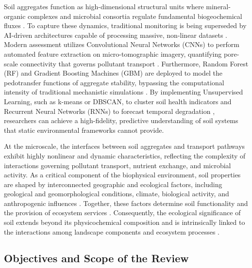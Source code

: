 \documentclass[preprint,12pt]{elsarticle}            %
\begin{document}
Soil aggregates function as high-dimensional structural units where
mineral-organic complexes and microbial consortia regulate fundamental
biogeochemical fluxes \cite{Six2004}. To capture these dynamics, traditional
monitoring is being superseded by AI-driven architectures capable of
processing massive, non-linear datasets
\cite{Lal2015,Baveye2016,Lehmann2020}. Modern assessment utilizes
Convolutional Neural Networks (CNNs) to perform automated feature extraction
on micro-tomographic imagery, quantifying pore-scale connectivity that governs
pollutant transport \cite{Demiral2026,Chen2025}. Furthermore, Random Forest
(RF) and Gradient Boosting Machines (GBM) are deployed to model the
pedotransfer functions of aggregate stability, bypassing the computational
intensity of traditional mechanistic simulations
\cite{DemissieNaveda2026,Guo2026}. By implementing Unsupervised Learning, such
as k-means or DBSCAN, to cluster soil health indicators
\cite{deOliveiraetal2022,Haller2023} and Recurrent Neural Networks (RNNs) to
forecast temporal degradation \cite{Mishra2025,Nunes2025}, researchers can
achieve a high-fidelity, predictive understanding of soil systems that static
environmental frameworks cannot provide.

At the microscale, the interfaces between soil aggregates and transport
pathways exhibit highly nonlinear and dynamic characteristics, reflecting the
complexity of interactions governing pollutant transport, nutrient exchange,
and microbial activity. As a critical component of the biophysical
environment, soil properties are shaped by interconnected geographic and
ecological factors, including geological and geomorphological conditions,
climate, biological activity, and anthropogenic influences
\cite{Brevik2015,Amundson2019}. Together, these factors determine soil
functionality and the provision of ecosystem services
\cite{Baveye2016,Klaucol2013,Klaucol2017,Lemenkova2023}. Consequently, the
ecological significance of soil extends beyond its physicochemical composition
and is intrinsically linked to the interactions among landscape components
and ecosystem processes \cite{Lemenkova2025a}.

\subsection{Objectives and Scope of the Review}\label{sec1.3}
\end{document}
